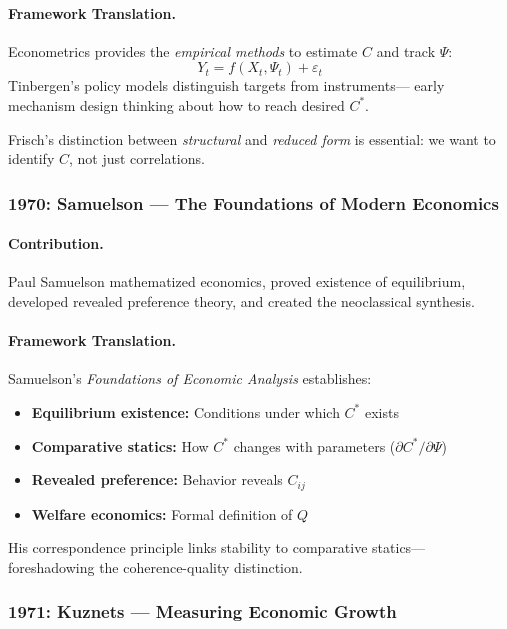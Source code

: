 \paragraph{Framework Translation.}
Econometrics provides the \emph{empirical methods} to estimate $C$ and track $\Psi$:
\begin{equation}
  Y_t = f(X_t, \Psi_t) + \varepsilon_t
\end{equation}
Tinbergen's policy models distinguish targets from instruments---
early mechanism design thinking about how to reach desired $C^*$.

Frisch's distinction between \emph{structural} and \emph{reduced form}
is essential: we want to identify $C$, not just correlations.

\subsubsection{1970: Samuelson --- The Foundations of Modern Economics}

\paragraph{Contribution.}
Paul Samuelson \citep{samuelson1947} mathematized economics, proved existence of equilibrium,
developed revealed preference theory, and created the neoclassical synthesis.

\paragraph{Framework Translation.}
Samuelson's \emph{Foundations of Economic Analysis} establishes:
\begin{itemize}
  \item \textbf{Equilibrium existence:} Conditions under which $C^*$ exists
  \item \textbf{Comparative statics:} How $C^*$ changes with parameters ($\partial C^*/\partial \Psi$)
  \item \textbf{Revealed preference:} Behavior reveals $C_{ij}$
  \item \textbf{Welfare economics:} Formal definition of $Q$
\end{itemize}

His correspondence principle links stability to comparative statics---
foreshadowing the coherence-quality distinction.

\subsubsection{1971: Kuznets --- Measuring Economic Growth}

